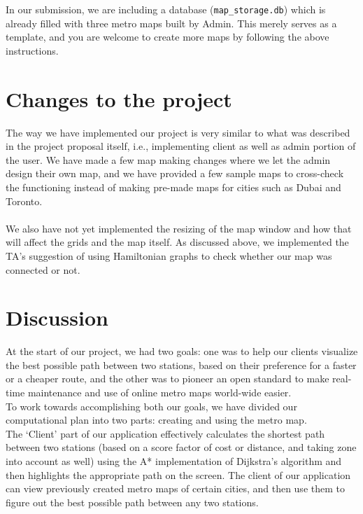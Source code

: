 \documentclass[fontsize=11pt]{article}
\begin{document}
    In our submission, we are including a database (\texttt{map\_storage.db}) which is already filled with three metro maps built by Admin. This merely serves as a template, and you are welcome to create more maps by following the above instructions.

    \section*{Changes to the project}
    The way we have implemented our project is very similar to what was described in the project proposal itself, i.e., implementing client as well as admin portion of the user. We have made a few map making changes where we let the admin design their own map, and we have provided a few sample maps to cross-check the functioning instead of making pre-made maps for cities such as Dubai and Toronto.\\
    \\
    We also have not yet implemented the resizing of the map window and how that will affect the grids and the map itself. As discussed above, we implemented the TA's suggestion of using Hamiltonian graphs to check whether our map was connected or not.

    \section*{Discussion}
    At the start of our project, we had two goals: one was to help our clients visualize the best possible path between two stations, based on their preference for a faster or a cheaper route, and the other was to pioneer an open standard to make real-time maintenance and use of online metro maps world-wide easier. \\

    To work towards accomplishing both our goals, we have divided our computational plan into two parts: creating and using the metro map. \\

    The `Client' part of our application effectively calculates the shortest path between two stations (based on a score factor of cost or distance, and taking zone into account as well) using the A* implementation of Dijkstra's algorithm and then highlights the appropriate path on the screen. The client of our application can view previously created metro maps of certain cities, and then use them to figure out the best possible path between any two stations.\\
\end{document}
